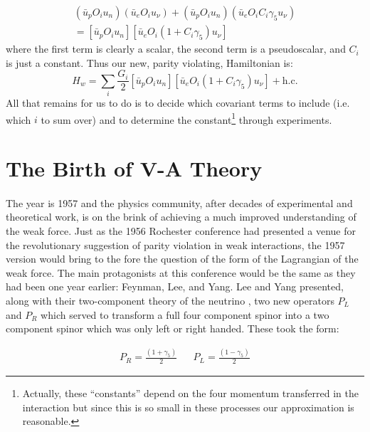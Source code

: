 \documentclass[12pt]{book}
\begin{document}
\begin{align}
\left(\bar{u}_{p}O_{i}u_{n}\right)\left(\bar{u}_{e}O_{i}u_{\nu}\right)+\left(\bar{u}_{p}O_{i}u_{n}\right)\left(\bar{u}_{e}O_{i}C_{i}\gamma_{5}u_{\nu}\right) \\
=\left[\bar{u}_{p}O_{i}u_{n}\right]\left[\bar{u}_{e}O_{i}\left(1+C_{i}\gamma_{5}\right)u_{\nu}\right]
\end{align}
where the first term is clearly a scalar, the second term is a pseudoscalar, and $C_{i}$ is just a constant. Thus our new, parity violating, Hamiltonian is: 
\begin{equation}\label{general:Hamilton}
 H_{w}=\displaystyle\sum_{i}\frac{G_{i}}{2}\left[\bar{u}_{p}O_{i}u_{n}\right]\left[\bar{u}_{e}O_{i}\left(1+C_{i}\gamma_{5}\right)u_{\nu}\right]+\text{h.c.}
\end{equation}
All that remains for us to do is to decide which covariant terms to include (i.e. which $i$ to sum over) and to determine the constant\footnote{Actually, these ``constants'' depend on the four momentum transferred in the interaction but since this is so small in these processes our approximation is reasonable.} through experiments. 

\section{The Birth of V-A Theory}

\paragraph{}The year is 1957 and the physics community, after decades of experimental and theoretical work, is on the brink of achieving a much improved understanding of the weak force. Just as the 1956 Rochester conference had presented a venue for the revolutionary suggestion of parity violation in weak interactions, the 1957 version would bring to the fore the question of the form of the Lagrangian of the weak force. The main protagonists at this conference would be the same as they had been one year earlier: Feynman, Lee, and Yang. Lee and Yang presented, along with their two-component theory of the neutrino \cite{lee:neutrinos}, two new operators $P_{L}$ and $P_{R}$ which served to transform a full four component spinor into a two component spinor which was only left or right handed. These took the form:

\begin{align}
 P_{R}=\frac{\left(1+\gamma_{5}\right)}{2} && P_{L}=\frac{\left(1-\gamma_{5}\right)}{2}
\end{align}
\end{document}
